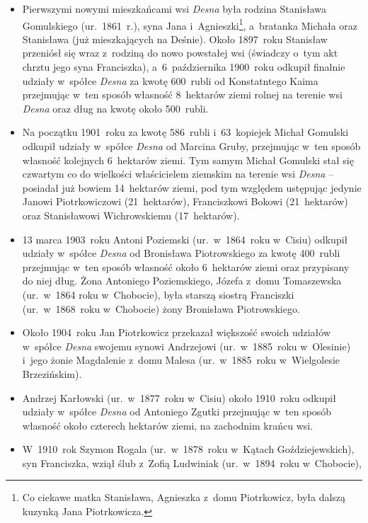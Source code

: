 \begin{itemize}
    \item Pierwszymi nowymi mieszkańcami wsi \emph{Desna} była rodzina
    Stanisława Gomulskiego (ur.~1861~r.), syna Jana i~Agnieszki\footnote{Co
    ciekawe matka Stanisława, Agnieszka z~domu Piotrkowicz, była dalszą
    kuzynką Jana Piotrkowicza.}, a~bratanka Michała oraz Stanisława (już
    mieszkających na Deśnie). Około 1897~roku Stanisław przeniósł się wraz
    z~rodziną do nowo powstałej wsi (świadczy o~tym akt chrztu jego syna
    Franciszka), a~6~października 1900~roku odkupił finalnie udziały w~spółce
    \emph{Desna} za kwotę 600~rubli od Konstatntego Kaima przejmując w~ten
    sposób własność 8~hektarów ziemi rolnej na terenie wsi \emph{Desna} oraz
    dług na kwotę około 500~rubli.
    \item Na początku 1901~roku za kwotę 586~rubli i~63~kopiejek Michał
    Gomulski odkupił udziały w~spółce \emph{Desna} od Marcina Gruby,
    przejmując w~ten sposób własność kolejnych 6~hektarów ziemi. Tym samym
    Michał Gomulski stał się czwartym co do wielkości właścicielem ziemskim na
    terenie wsi \emph{Desna} -- posiadał już bowiem 14~hektarów ziemi, pod
    tym względem ustępując jedynie Janowi Piotrkowiczowi (21~hektarów),
    Franciszkowi Bokowi (21~hektarów) oraz Stanisławowi Wichrowskiemu
    (17~hektarów).
    \item 13 marca 1903~roku Antoni Poziemski (ur.~w~1864~roku w~Cisiu)
    odkupił udziały w~spółce \emph{Desna} od Bronisława Piotrowskiego za kwotę
    400~rubli przejmując w~ten sposób własność około 6~hektarów ziemi oraz
    przypisany do niej dług. Żona Antoniego Poziemskiego, Józefa z~domu
    Tomaszewska (ur.~w~1864 roku w~Chobocie), była starszą siostrą Franciszki
    (ur.~w~1868~roku w~Chobocie) żony Bronisława Piotrowskiego. 
    \item Około 1904~roku Jan Piotrkowicz przekazał większość swoich
    udziałów w~spółce \emph{Desna} swojemu synowi Andrzejowi (ur.~w~1885~roku
    w~Olesinie) i~jego żonie Magdalenie z~domu Malesa (ur.~w~1885~roku
    w~Wielgolesie Brzezińskim).
    \item Andrzej Karłowski (ur.~w~1877~roku w~Cisiu) około 1910~roku odkupił
    udziały w~spółce \emph{Desna} od Antoniego Zgutki przejmując w~ten sposób
    własność około czterech hektarów ziemi, na zachodnim krańcu wsi.
    \item W~1910~rok Szymon Rogala (ur.~w~1878~roku w~Kątach Goździejewskich),
    syn Franciszka, wziął ślub z~Zofią Ludwiniak (ur.~w~1894~roku w~Chobocie),

\end{itemize}

